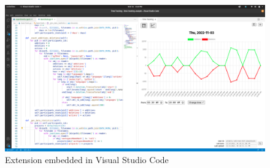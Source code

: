 \begin{figure}[htbp]
  \centering
  \includegraphics[scale=0.22]{chapters/methodology/graphics/extension-embedded.png}
  \caption{Extension embedded in Visual Studio Code}
  \label{fig:embedded_extension}
\end{figure}
